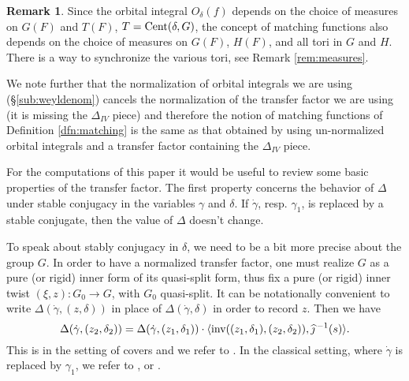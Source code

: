 \documentclass{article}
\theoremstyle{definition}
\newtheorem{rem}[thm]{Remark}
\numberwithin{equation}{section}
\renewcommand{\-}{\hyp{}}
\begin{document}
\begin{rem} \label{rem:matchmeasures}
	Since the orbital integral $O_\delta(f)$ depends on the choice of measures on $G(F)$ and $T(F)$, $T=\textrm{Cent}(\delta,G)$, the concept of matching functions also depends on the choice of measures on $G(F)$, $H(F)$, and all tori in $G$ and $H$. There is a way to synchronize the various tori, see Remark \ref{rem:measures}.

	We note further that the normalization of orbital integrals we are using (\S\ref{sub:weyldenom}) cancels the normalization of the transfer factor we are using (it is missing the $\Delta_{IV}$ piece) and therefore the notion of matching functions of Definition \ref{dfn:matching} is the same as that obtained by using un-normalized orbital integrals and a transfer factor containing the $\Delta_{IV}$ piece.
\end{rem}

For the computations of this paper it would be useful to review some basic properties of the transfer factor. The first property concerns the behavior of $\Delta$ under stable conjugacy in the variables $\gamma$ and $\delta$. If $\dot\gamma$, resp. $\gamma_1$, is replaced by a stable conjugate, then the value of $\Delta$ doesn't change. 

To speak about stably conjugacy in $\delta$, we need to be a bit more precise about the group $G$. In order to have a normalized transfer factor, one must realize $G$ as a pure (or rigid) inner form of its quasi-split form, thus fix a pure (or rigid) inner twist $(\xi,z) : G_0 \to G$, with $G_0$ quasi-split. It can be notationally convenient to write $\Delta(\dot\gamma,(z,\delta))$ in place of $\Delta(\dot\gamma,\delta)$ in order to record $z$. Then we have 
\begin{equation} \label{eq:tfstab}
	\Delta(\dot\gamma,(z_2,\delta_2)) = \Delta(\dot\gamma,(z_1,\delta_1)) \cdot \langle\textrm{inv}((z_1,\delta_1),(z_2,\delta_2)),\widehat \jmath\,^{-1}(s)\rangle.
\end{equation}
This is in the setting of covers and we refer to \cite[Lemma 4.3.1]{KalHDC}. In the classical setting, where $\dot\gamma$ is replaced by $\gamma_1$, we refer to \cite[Definitions 4.2.7,4.3.11]{KalIMS}, or \cite[\S4.1]{LS87}.
\end{document}
